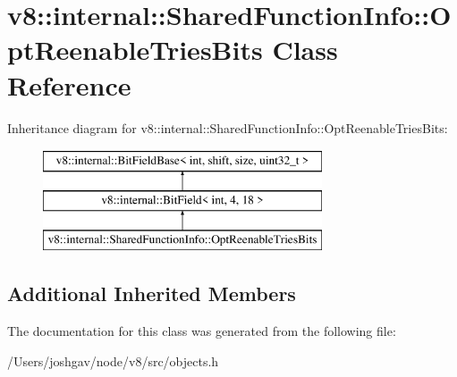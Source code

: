 \hypertarget{classv8_1_1internal_1_1_shared_function_info_1_1_opt_reenable_tries_bits}{}\section{v8\+:\+:internal\+:\+:Shared\+Function\+Info\+:\+:Opt\+Reenable\+Tries\+Bits Class Reference}
\label{classv8_1_1internal_1_1_shared_function_info_1_1_opt_reenable_tries_bits}
Inheritance diagram for v8\+:\+:internal\+:\+:Shared\+Function\+Info\+:\+:Opt\+Reenable\+Tries\+Bits\+:\begin{figure}[H]
\begin{center}
\leavevmode
\includegraphics[height=3.000000cm]{classv8_1_1internal_1_1_shared_function_info_1_1_opt_reenable_tries_bits}
\end{center}
\end{figure}
\subsection*{Additional Inherited Members}


The documentation for this class was generated from the following file\+:\begin{DoxyCompactItemize}
\item 
/\+Users/joshgav/node/v8/src/objects.\+h\end{DoxyCompactItemize}
